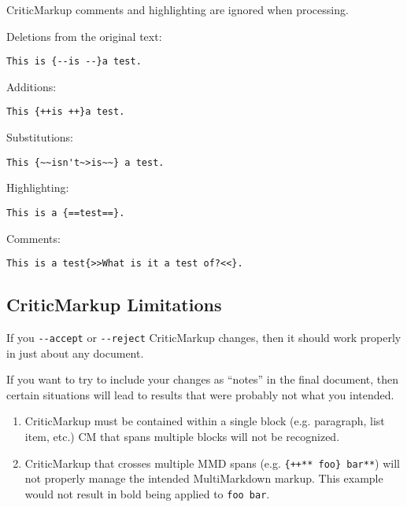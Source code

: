CriticMarkup comments and highlighting are ignored when processing.

Deletions from the original text:

\begin{verbatim}
This is {--is --}a test.
\end{verbatim}

Additions:

\begin{verbatim}
This {++is ++}a test.
\end{verbatim}

Substitutions:

\begin{verbatim}
This {~~isn't~>is~~} a test.
\end{verbatim}

Highlighting:

\begin{verbatim}
This is a {==test==}.
\end{verbatim}

Comments:

\begin{verbatim}
This is a test{>>What is it a test of?<<}.
\end{verbatim}

\subsection{CriticMarkup Limitations }
\label{criticmarkuplimitations}

If you \texttt{-{}-accept} or \texttt{-{}-reject} CriticMarkup changes, then it should work properly in just about any document.

If you want to try to include your changes as ``notes'' in the final document, then certain situations will lead to results that were probably not what you intended.

\begin{enumerate}
\item CriticMarkup must be contained within a single block (e.g. paragraph, list item, etc.) CM that spans multiple blocks will not be recognized.

\item CriticMarkup that crosses multiple \gls{MMD} spans (e.g. \texttt{\{++** foo\} bar**}) will not properly manage the intended MultiMarkdown markup. This example would not result in bold being applied to \texttt{foo bar}.

\end{enumerate}

